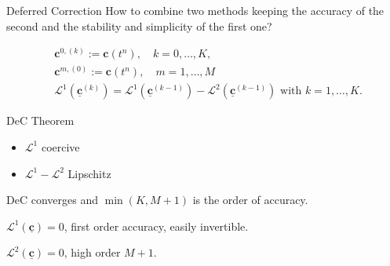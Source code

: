 \documentclass[aspectratio=169]{beamer}
\newcommand{\1}{\begin{pmatrix}
                 1\\
                 1
                \end{pmatrix}}
\def\L{\mathcal{L}}
\def\bbc{\underline{\mathbf{c}}}
\def\bc{\mathbf{c}}
\begin{document}
\begin{frame}{Deferred Correction}
How to combine two methods keeping the accuracy of the second and the stability and simplicity of the first one?

\begin{minipage}{0.58\textwidth}
\begin{equation*}\label{DeC_method}
\begin{split}
&\bc^{0,(k)}:=\bc(t^n), \quad k=0,\dots, K,\\
&\bc^{m,(0)}:=\bc(t^n),\quad m=1,\dots, M\\
&\L^1(\bbc^{(k)})=\L^1(\bbc^{(k-1)})-\L^2(\bbc^{(k-1)})\text{ with }k=1,\dots,K.
\end{split}
\end{equation*}

\begin{block}{DeC Theorem}
	\begin{itemize} \item $\L^1$ coercive \item $\L^1-\L^2$ Lipschitz \end{itemize}
DeC converges and $\min(K,M+1)$ is the order of accuracy.
\end{block}
\end{minipage} \hfill
\begin{minipage}{0.4\textwidth}
	\begin{itemize}
		{
			\item $\mathcal{L}^1(\bbc)=0$, first order accuracy, easily invertible.
			\item $\mathcal{L}^2(\bbc)=0$, high order $M+1$.
		}
	\end{itemize}
\end{minipage}

\end{frame}
\end{document}
